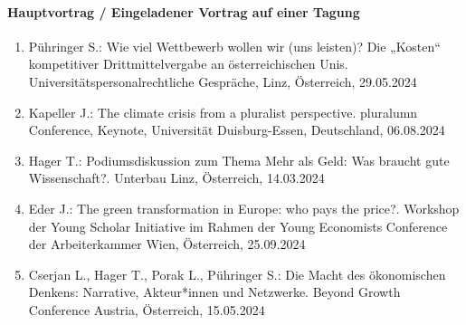 \paragraph{Hauptvortrag / Eingeladener Vortrag auf einer Tagung}
\begin{enumerate}
	\item Pühringer S.: Wie viel Wettbewerb wollen wir (uns leisten)? Die „Kosten“ kompetitiver Drittmittelvergabe an österreichischen Unis. Universitätspersonalrechtliche Gespräche, Linz, Österreich, 29.05.2024
	\item Kapeller J.: The climate crisis from a pluralist perspective. pluralumn Conference, Keynote, Universität Duisburg-Essen, Deutschland, 06.08.2024
	\item Hager T.: Podiumsdiskussion zum Thema \glqq Mehr als Geld: Was braucht gute Wissenschaft?\grqq{}. Unterbau Linz, Österreich, 14.03.2024
	\item Eder J.: The green transformation in Europe: who pays the price?. Workshop der Young Scholar Initiative im Rahmen der Young Economists Conference der Arbeiterkammer Wien, Österreich, 25.09.2024
	\item Cserjan L., Hager T., Porak L., Pühringer S.: Die Macht des ökonomischen Denkens: Narrative, Akteur*innen und Netzwerke. Beyond Growth Conference Austria, Österreich, 15.05.2024
\end{enumerate}
